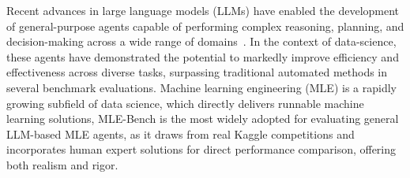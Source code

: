 


Recent advances in large language models (LLMs) have enabled the development of general-purpose agents capable of performing complex reasoning, planning, and decision-making across a wide range of domains~\citep{achiam2023gpt,team2023gemini,liu2024deepseek}. In the context of data-science\citep{chan2024mle-bench,jing2024dsbench,majumder2024discoverybench,sahu2024insightbench,huang2023mlagentbench}, these agents have demonstrated the potential to markedly improve efficiency and effectiveness across diverse tasks, surpassing traditional automated methods in several benchmark evaluations.
Machine learning engineering (MLE) is a rapidly growing subfield of data science, which directly 
delivers runnable machine learning solutions, MLE-Bench\citep{chan2024mle-bench} is the most widely adopted for evaluating general LLM-based MLE agents, as it draws from real Kaggle competitions and incorporates human expert solutions for direct performance comparison, offering both realism and rigor.  

